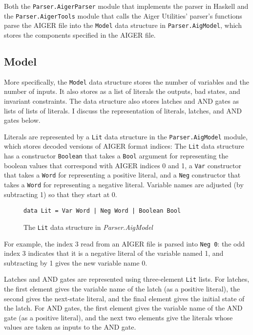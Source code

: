 \documentclass[12pt,a4paper,twoside,openright]{report}
\begin{document}
{Both the \verb,Parser.AigerParser, module that implements the parser in Haskell and
the \verb,Parser.AigerTools, module that calls the Aiger Utilities' parser's functions
parse the AIGER file into the \verb,Model, data structure in \verb,Parser.AigModel,,
which stores the components specified in the AIGER file.

\subsection{Model}

More specifically, the \verb,Model, data structure stores the number of variables and
the number of inputs. It also stores as a list of literals the outputs, bad states,
and invariant constraints. The data structure also stores latches and AND gates as
lists of lists of literals. I discuss the representation of literals, latches, and
AND gates below.

Literals are represented by a \verb,Lit, data structure in the \verb,Parser.AigModel,
module, which stores decoded versions of AIGER format indices:
The \verb,Lit, data structure has a constructor \verb,Boolean, that takes a \verb,Bool,
argument for representing the boolean values that correspond with AIGER indices
0 and 1, a \verb,Var, constructor that takes a \verb,Word, for representing a positive literal,
and a \verb,Neg, constructor that takes a \verb,Word, for representing a negative literal.
Variable names are adjusted (by subtracting 1) so that they start at 0.

\begin{figure}[H]
\centering
\begin{lstlisting}
data Lit = Var Word | Neg Word | Boolean Bool
\end{lstlisting}
\caption{The {\tt Lit} data structure in {\it Parser.AigModel}}
\end{figure}

For example, the index 3 read from an AIGER file is parsed into \verb,Neg 0,:
the odd index 3 indicates that it is a negative literal of the variable named 1, and
subtracting by 1 gives the new variable name 0.

Latches and AND gates are represented using three-element \verb,Lit, lists.
For latches, the first element gives the variable name of the latch (as a positive literal),
the second gives the next-state literal, and the final element gives the initial state
of the latch. For AND gates, the first element gives the variable name of the AND gate
(as a positive literal), and the next two elements give the literals whose values are taken
as inputs to the AND gate.

}
\end{document}
